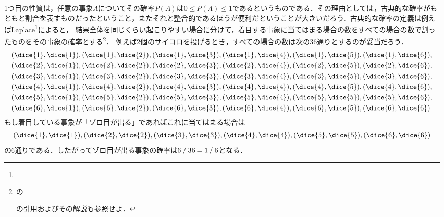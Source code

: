 \documentclass[main.tex]{subfiles}
\begin{document}
1つ目の性質は，任意の事象\(A\)についてその確率\(P(A)\)は\(0 \leq P(A) \leq 1\)であるというものである．その理由としては，古典的な確率がもともと割合を表すものだったということ，またそれと整合的であるほうが便利だということが大きいだろう．古典的な確率の定義は例えばLaplace\footnote{%
}によると，
結果全体を同じくらい起こりやすい場合に分けて，着目する事象に当てはまる場合の数をすべての場合の数で割ったものをその事象の確率とする\footnote{%
の\begin{french}\end{french}の引用およびその解説も参照せよ．}．
例えば2個のサイコロを投げるとき，すべての場合の数は次の36通りとするのが妥当だろう．
\begin{align*}
    & (\dice{1}, \dice{1}), (\dice{1}, \dice{2}), (\dice{1}, \dice{3}), (\dice{1}, \dice{4}), (\dice{1}, \dice{5}), (\dice{1}, \dice{6}), \\
    & (\dice{2}, \dice{1}), (\dice{2}, \dice{2}), (\dice{2}, \dice{3}), (\dice{2}, \dice{4}), (\dice{2}, \dice{5}), (\dice{2}, \dice{6}), \\
    & (\dice{3}, \dice{1}), (\dice{3}, \dice{2}), (\dice{3}, \dice{3}), (\dice{3}, \dice{4}), (\dice{3}, \dice{5}), (\dice{3}, \dice{6}), \\
    & (\dice{4}, \dice{1}), (\dice{4}, \dice{2}), (\dice{4}, \dice{3}), (\dice{4}, \dice{4}), (\dice{4}, \dice{5}), (\dice{4}, \dice{6}), \\
    & (\dice{5}, \dice{1}), (\dice{5}, \dice{2}), (\dice{5}, \dice{3}), (\dice{5}, \dice{4}), (\dice{5}, \dice{5}), (\dice{5}, \dice{6}), \\
    & (\dice{6}, \dice{1}), (\dice{6}, \dice{2}), (\dice{6}, \dice{3}), (\dice{6}, \dice{4}), (\dice{6}, \dice{5}), (\dice{6}, \dice{6}).
\end{align*}
もし着目している事象が「ゾロ目が出る」であればこれに当てはまる場合は
\begin{align*}
    (\dice{1}, \dice{1}), (\dice{2}, \dice{2}), (\dice{3}, \dice{3}), (\dice{4}, \dice{4}), (\dice{5}, \dice{5}), (\dice{6}, \dice{6})
\end{align*}
の6通りである．したがってゾロ目が出る事象の確率は\(6\mathbin{/}36 = 1\mathbin{/}6\)となる．
\end{document}
